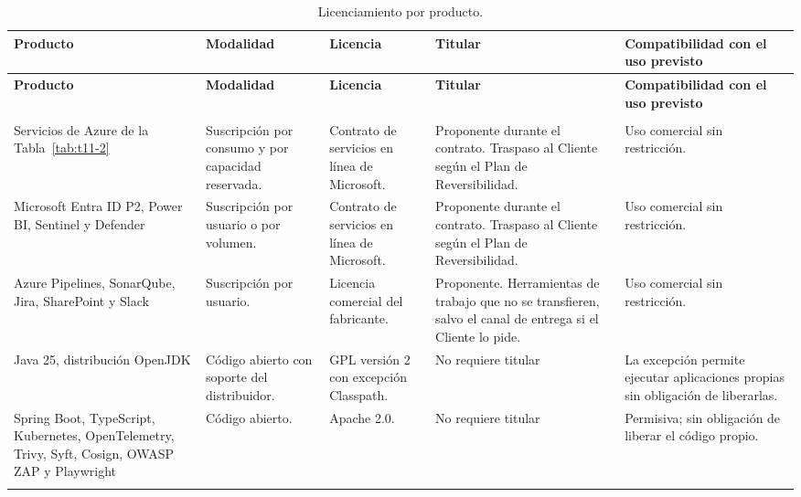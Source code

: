 \documentclass[11pt]{article}
\begin{document}
\begin{longtable}[]{@{}
  >{\raggedright\arraybackslash}p{}
  >{\raggedright\arraybackslash}p{}
  >{\raggedright\arraybackslash}p{}
  >{\raggedright\arraybackslash}p{}
  >{\raggedright\arraybackslash}p{}@{}}
\caption{Licenciamiento por producto.}\label{tab:t11-11}\\
\toprule\noalign{}
\textbf{Producto} & \textbf{Modalidad} & \textbf{Licencia} & \textbf{Titular} & \textbf{Compatibilidad con el uso previsto} \\
\midrule\noalign{}
\endfirsthead
\toprule\noalign{}
\textbf{Producto} & \textbf{Modalidad} & \textbf{Licencia} & \textbf{Titular} & \textbf{Compatibilidad con el uso previsto} \\
\midrule\noalign{}
\endhead
\bottomrule\noalign{}
\multicolumn{5}{@{}p{\columnwidth}@{}}{\rule{0pt}{3.2ex}\textbf{Fuente:} Elaboración propia.} \\
\endlastfoot
Servicios de Azure de la Tabla~\mbox{\ref{tab:t11-2}} & Suscripción por consumo y por capacidad reservada. & Contrato de servicios en línea de Microsoft. & Proponente durante el contrato. Traspaso al Cliente según el Plan de Reversibilidad. & Uso comercial sin restricción. \\ \addlinespace
Microsoft Entra ID P2, Power BI, Sentinel y Defender & Suscripción por usuario o por volumen. & Contrato de servicios en línea de Microsoft. & Proponente durante el contrato. Traspaso al Cliente según el Plan de Reversibilidad. & Uso comercial sin restricción. \\ \addlinespace
Azure Pipelines, SonarQube, Jira, SharePoint y Slack & Suscripción por usuario. & Licencia comercial del fabricante. & Proponente. Herramientas de trabajo que no se transfieren, salvo el canal de entrega si el Cliente lo pide. & Uso comercial sin restricción. \\ \addlinespace
Java 25, distribución OpenJDK & Código abierto con soporte del distribuidor. & GPL versión 2 con excepción Classpath. & No requiere titular & La excepción permite ejecutar aplicaciones propias sin obligación de liberarlas. \\ \addlinespace
Spring Boot, TypeScript, Kubernetes, OpenTelemetry, Trivy, Syft, Cosign, OWASP ZAP y Playwright & Código abierto. & Apache 2.0. & No requiere titular & Permisiva; sin obligación de liberar el código propio. \\ \addlinespace

\end{longtable}
\end{document}
